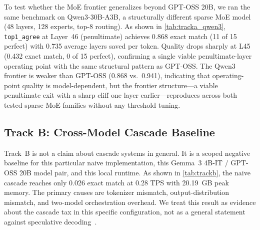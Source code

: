 \documentclass[11pt]{article}
\begin{document}
To test whether the MoE frontier generalizes beyond GPT-OSS 20B, we ran the same benchmark on Qwen3-30B-A3B, a structurally different sparse MoE model (48 layers, 128 experts, top-8 routing). As shown in \cref{tab:tracka_qwen3}, \texttt{top1\_agree} at Layer~46 (penultimate) achieves 0.868 exact match (11 of 15 perfect) with 0.735 average layers saved per token. Quality drops sharply at L45 (0.432 exact match, 0 of 15 perfect), confirming a single viable penultimate-layer operating point with the same structural pattern as GPT-OSS. The Qwen3 frontier is weaker than GPT-OSS (0.868 vs.\ 0.941), indicating that operating-point quality is model-dependent, but the frontier structure---a viable penultimate exit with a sharp cliff one layer earlier---reproduces across both tested sparse MoE families without any threshold tuning.

\subsection{Track B: Cross-Model Cascade Baseline}

\begin{table}[t]
\centering
\small
\caption{Track~B comparison on the local Apple MLX runtime. The Track~A row provides context.}
\label{tab:trackb}
\end{table}

Track~B is not a claim about cascade systems in general. It is a scoped negative baseline for this particular naive implementation, this Gemma~3 4B-IT / GPT-OSS 20B model pair, and this local runtime. As shown in \cref{tab:trackb}, the naive cascade reaches only 0.026 exact match at 0.28 TPS with 20.19~GB peak memory. The primary causes are tokenizer mismatch, output-distribution mismatch, and two-model orchestration overhead. We treat this result as evidence about the cascade tax in this specific configuration, not as a general statement against speculative decoding~\cite{leviathan2023speculative}.
\end{document}
